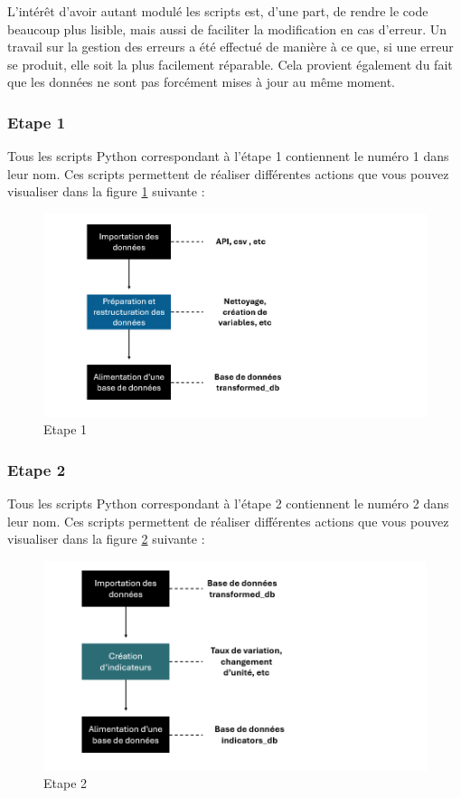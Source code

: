 \documentclass[12pt]{article}
\begin{document}
L'intérêt d'avoir autant modulé les scripts est, d'une part, de rendre le code beaucoup 
plus lisible, mais aussi de faciliter la modification en cas d'erreur. Un travail sur 
la gestion des erreurs a été effectué de manière à ce que, si une erreur se produit, 
elle soit la plus facilement réparable. Cela provient également du fait que les données 
ne sont pas forcément mises à jour au même moment.

\subsubsection{Etape 1}

Tous les scripts Python correspondant à l'étape 1 contiennent le numéro 1 dans leur nom. 
Ces scripts permettent de réaliser différentes actions que vous pouvez visualiser dans 
la figure \ref{fig:etape1} suivante :

\begin{figure}[H]
    \centering
    \includegraphics[width=\textwidth]{schema_et1.png}
    \caption{ Etape 1}
    \label{fig:etape1}
\end{figure}


\subsubsection{Etape 2}

Tous les scripts Python correspondant à l'étape 2 contiennent le numéro 2 dans leur nom. 
Ces scripts permettent de réaliser différentes actions que vous pouvez visualiser dans 
la figure \ref{fig:etape2} suivante :



\begin{figure}[H]
    \centering
    \includegraphics[width=\textwidth]{schema_et2.png}
    \caption{ Etape 2}
    \label{fig:etape2}
\end{figure}
\end{document}
